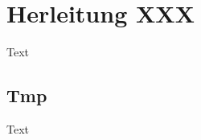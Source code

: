 \chapter{Herleitung XXX}
\label{chap:appendix_b}

   Text

   \section{Tmp}
   \label{sec:app_b_tmp}
   
      Text
